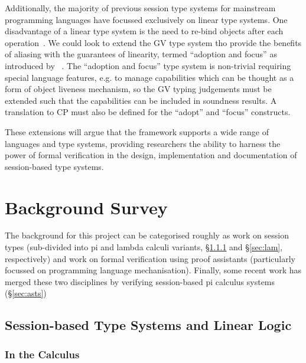 \documentclass{mprop}
\begin{document}
Additionally, the majority of previous session type systems for mainstream programming languages have focussed exclusively on linear type systems. One disadvantage of a linear type system is the need to re-bind objects after each operation~\cite{Gay:2010:LAST}. We could look to extend the GV type system tho provide the benefits of aliasing with the guarantees of linearity, termed ``adoption and focus'' as introduced by~\citeauthor{Fahndrich:2002} \cite{Fahndrich:2002}. The ``adoption and focus'' type system is non-trivial requiring special language features, e.g. to manage capabilities which can be thought as a form of object liveness mechanism, so the GV typing judgements must be extended such that the capabilities can be included in soundness results. A translation to CP must also be defined for the ``adopt'' and ``focus'' constructs.

These extensions will argue that the framework supports a wide range of languages and type systems, providing researchers the ability to harness the power of formal verification in the design, implementation and documentation of session-based type systems.

\section{Background Survey}


The background for this project can be categorised roughly as work on session types (sub-divided into pi and lambda calculi variants, \S \ref{sec:pis} and \S \ref{sec:lam}, respectively) and work on formal verification using proof assistants (particularly focussed on programming language mechanisation). Finally, some recent work has merged these two disciplines by verifying session-based pi calculus systems (\S \ref{sec:asts})

\subsection{Session-based Type Systems and Linear Logic}\label{sec:sts}

\subsubsection{In the \pi Calculus}\label{sec:pis}
\end{document}
